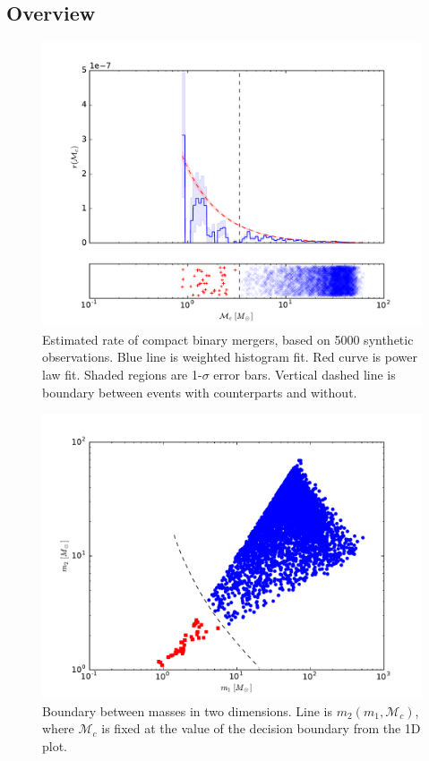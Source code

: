 \subsection{Overview}

\begin{figure}[ht]
  \includegraphics[width=\columnwidth]{img/chirp-mass-distribution}
  \caption{Estimated rate of compact binary mergers, based on 5000 synthetic observations. Blue line is weighted histogram fit. Red curve is power law fit. Shaded regions are 1-$\sigma$ error bars. Vertical dashed line is boundary between events with counterparts and without.}
  \label{fig:chirp}
\end{figure}

\begin{figure}[ht]
  \includegraphics[width=\columnwidth]{img/output/mass-distribution}
  \caption{Boundary between masses in two dimensions. Line is $m_2(m_1, \mathcal{M}_c)$, where $\mathcal{M}_c$ is fixed at the value of the decision boundary from the 1D plot.}
  \label{fig:2D}
\end{figure}

